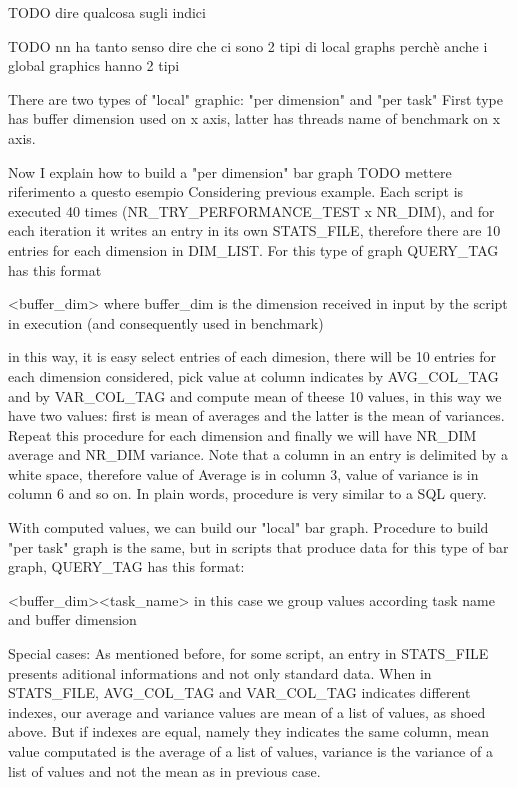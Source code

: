 \documentclass[a4paper,10pt]{article}
\begin{document}
\begin{multicols}{2}
TODO dire qualcosa sugli indici 

TODO nn ha tanto senso dire che ci sono 2 tipi di local graphs perchè 
anche i global graphics hanno 2 tipi

There are two types of "local" graphic: "per dimension"  and "per task"
First type has buffer dimension used on x axis, latter has threads name of benchmark on x axis.

Now I explain how to build a "per dimension" bar graph
TODO mettere riferimento a questo esempio
Considering previous example. Each script is executed 40 times
(NR\_TRY\_PERFORMANCE\_TEST x NR\_DIM), and for each iteration
it writes an entry in its own STATS\_FILE, therefore there are 10 entries for each
dimension in DIM\_LIST. For this type of graph QUERY\_TAG has this format

<buffer\_dim> where buffer\_dim is the dimension received in input by the script in execution
(and consequently used in benchmark)

in this way, it is easy select entries of each dimesion, there will be 10 entries for each 
dimension considered, pick value at column indicates by AVG\_COL\_TAG and by VAR\_COL\_TAG
and compute mean of theese 10 values, in this way we have two values: first is mean
of averages and the latter is the mean of variances. Repeat this procedure for each dimension and finally we
will have NR\_DIM average and NR\_DIM variance. Note that a column in an entry is delimited by
a white space, therefore value of Average is in column 3, value of variance is in column 6 and so on.
In plain words, procedure is very similar to a SQL query.

With computed values, we can build our "local" bar graph. Procedure to build
"per task" graph is the same, but in scripts that produce data for this type of bar graph,
QUERY\_TAG has this format: 

<buffer\_dim><task\_name> in this case we group values according task name and buffer dimension

Special cases:
As mentioned before, for some script, an entry in STATS\_FILE presents aditional informations 
and not only standard data. 
When in STATS\_FILE, AVG\_COL\_TAG and VAR\_COL\_TAG indicates different indexes, our average
and variance values are mean of a list of values, as shoed above. But if indexes are equal, namely 
they indicates the same column, mean value computated is the average of a list of values, variance
is the variance of a list of values and not the mean as in previous case.






\end{multicols}
\end{document}
